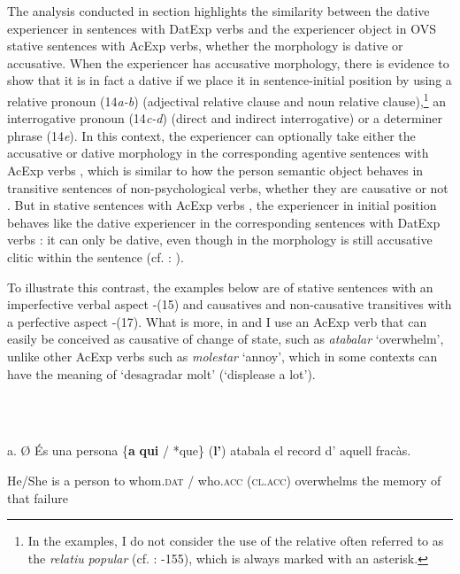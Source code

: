 \documentclass[output=paper,modfonts,nonflat]{langsci/langscibook}
\begin{document}
The analysis conducted in section  highlights the similarity between the dative experiencer in sentences with DatExp verbs and the experiencer object in OVS stative sentences with AcExp verbs, whether the morphology is dative or accusative. When the experiencer has accusative morphology, there is evidence to show that it is in fact a dative if we place it in sentence-initial position by using a relative pronoun (14\textit{a-b}) (adjectival relative clause and noun relative clause),\footnote{In the examples, I do not consider the use of the relative often referred to as the \textit{relatiu} \textit{popular} (cf. \citealt{Ginebra2005}: -155), which is always marked with an asterisk.} an interrogative pronoun (14\textit{c-d}) (direct and indirect interrogative) or a determiner phrase (14\textit{e}). In this context, the experiencer can optionally take either the accusative or dative morphology in the corresponding agentive sentences with AcExp verbs , which is similar to how the person semantic object behaves in transitive sentences of non-psychological verbs, whether they are causative or not . But in stative sentences with AcExp verbs , the experiencer in initial position behaves like the dative experiencer in the corresponding sentences with DatExp verbs : it can only be dative, even though in  the morphology is still accusative clitic within the sentence (cf. \citealt{Royo2017}: ).

To illustrate this contrast, the examples below are of stative sentences with an imperfective verbal aspect -(15) and causatives and non-causative transitives with a perfective aspect -(17). What is more, in  and  I use an AcExp verb that can easily be conceived as causative of change of state, such as \textit{atabalar} ‘overwhelm’, unlike other AcExp verbs such as \textit{molestar} ‘annoy’, which in some contexts can have the meaning of ‘desagradar molt’ (‘displease a lot’).

\ea%
    \label{ex:key:14}
    \gll\\
        \\
    \glt
    \z

         a. Ø         És una persona \{\textbf{a}  \textbf{qui}             / *que\}       (\textbf{l’})          atabala         el   record    d’ aquell fracàs.

             He/She is  a     person     to whom.\textsc{dat} / who.\textsc{acc} (\textsc{cl.acc}) overwhelms the memory of that     failure
\end{document}
